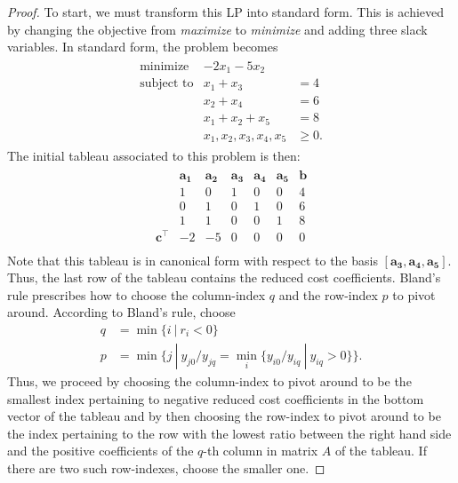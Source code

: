 \documentclass[12pt]{article}
\theoremstyle{definition}
\newcommand{\vect}[1]{\boldsymbol{#1}}
\begin{document}
\begin{proof}
  To start, we must transform this LP into standard form. This is achieved by
  changing the objective from \textit{maximize} to \textit{minimize} and
  adding three slack variables. In standard form,
  the problem becomes
  \begin{align*}
    \begin{array}{rrl}
      \text{minimize} & -2x_1 -5x_2&\\
      \text{subject to} & x_1 + x_3 &= 4 \\
      & x_2 + x_4 &= 6 \\
      & x_1 + x_2 + x_5 &= 8 \\
      & x_1, x_2, x_3, x_4, x_5 &\geq 0.
    \end{array}
  \end{align*}
  The initial tableau associated to this problem is then:
  \begin{align*}
    \begin{matrix}
      & \vect{a_1} & \vect{a_2} & \vect{a_3} & \vect{a_4} & \vect{a_5} & \vect{b} \\
      & 1 & 0 & 1 & 0 & 0 & 4 \\
      & 0 & 1 & 0 & 1 & 0 & 6 \\
      & 1 & 1 & 0 & 0 & 1 & 8 \\
      \vect{c}^\intercal & -2 & -5  & 0 & 0 & 0 & 0 \\
    \end{matrix}
  \end{align*}
  Note that this tableau is in canonical form with respect to the basis
  $[\vect{a_3}, \vect{a_4}, \vect{a_5}]$. Thus, the last row of the tableau
  contains the reduced cost coefficients. Bland's rule prescribes how to choose
  the column-index $q$ and the row-index $p$ to pivot around. According to
  Bland's rule, choose
  \begin{align*}
    q &= \min\{i\ |\ r_i < 0  \}\\
    p &= \min\{j\ |\ y_{j0}/y_{jq} = \min_i\{y_{i0}/y_{iq}\ |\ y_{iq} > 0\} \}.
  \end{align*}
  Thus, we proceed by choosing the column-index to pivot around to be the smallest
  index pertaining to negative reduced cost coefficients in the bottom vector of the
  tableau and by then choosing the row-index to pivot around to be the
  index pertaining to the row with the lowest ratio between the right hand side and
  the positive coefficients of the $q$-th column in matrix $A$ of the tableau.
  If there are two such row-indexes, choose the smaller one.


\end{proof}
\end{document}
